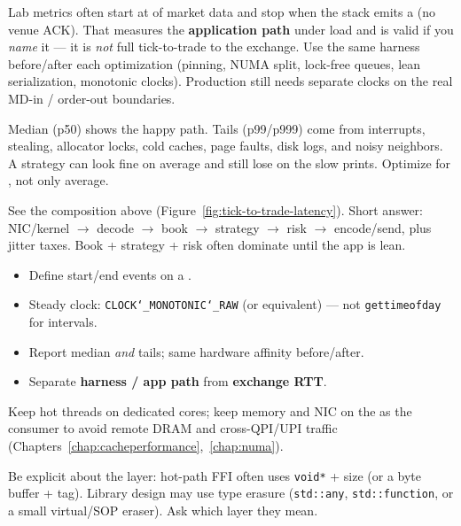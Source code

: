 Lab metrics often start at  of market data and stop when the 
stack emits a  (no venue ACK). That measures the 
\textbf{application path} under load and is valid if you \emph{name} it --- it is 
\emph{not} full tick-to-trade to the exchange.  
Use the same harness before/after each optimization (pinning, NUMA split, lock-free queues, 
lean serialization, monotonic clocks). Production still needs separate clocks on the 
real MD-in / order-out boundaries.

Median (p50) shows the happy path. Tails (p99/p999) come from interrupts, stealing, 
allocator locks, cold caches, page faults, disk logs, and noisy neighbors. A strategy can 
look fine on average and still lose on the slow prints. Optimize for 
, not only average.

See the composition above (Figure~\ref{fig:tick-to-trade-latency}). Short answer: 
NIC/kernel $\rightarrow$ decode $\rightarrow$ book $\rightarrow$ strategy $\rightarrow$ 
risk $\rightarrow$ encode/send, plus jitter taxes. Book + strategy + risk often dominate 
until the app is lean.

\begin{itemize}
    \item Define start/end events on a .
    \item Steady clock: \texttt{CLOCK\char`_MONOTONIC\char`_RAW} (or equivalent) --- not 
          \texttt{gettimeofday} for intervals.
    \item Report median \emph{and} tails; same hardware affinity before/after.
    \item Separate \textbf{harness / app path} from \textbf{exchange RTT}.
\end{itemize}

Keep hot threads on dedicated cores; keep memory and NIC on the  
as the consumer to avoid remote DRAM and cross-QPI/UPI traffic 
(Chapters~\ref{chap:cacheperformance},~\ref{chap:numa}).

Be explicit about the layer: hot-path FFI often uses \texttt{void*} + size (or a byte 
buffer + tag). Library design may use type erasure (\texttt{std::any}, 
\texttt{std::function}, or a small virtual/SOP eraser). Ask which layer they mean.


